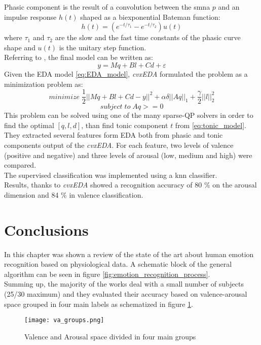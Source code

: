 Phasic component is the result of a convolution between the \gls{smna} $p$ and an impulse response $h(t)$ shaped as a biexponential Bateman function:
\begin{equation}
	h(t)=(e^{-t/\tau_1}-e^{-t/\tau_2})u(t)
\end{equation}
where $\tau_1$ and $\tau_2$ are the slow and the fast time constants of the phasic curve shape and $u(t)$ is the unitary step function.
\\
Referring to \cite{greco2016arousal}, the final model can be written as:
\begin{equation}
	\label{eq:EDA_model}
	y=Mq+Bl+Cd+\varepsilon 
\end{equation}
Given the EDA model \ref{eq:EDA_model}, \textit{cvxEDA} formulated the problem as a minimization problem as:
\begin{equation}
	minimize \; \dfrac{1}{2} ||Mq+Bl+Cd-y||^2+\alpha \delta ||Aq||_1+\dfrac{\gamma}{2}||l||^2_2
\end{equation}
\[subject \; to \; Aq>=0 \]
This problem can be solved using one of the many sparse-QP solvers in order to find the optimal $[q,l,d]$, than find tonic component $t$ from \ref{eq:tonic_model}.
\\
They extracted several features form EDA both from phasic and tonic components output of the \textit{cvxEDA}. For each feature, two levels of valence (positive and negative) and three levels of arousal (low, medium and high) were compared.
\\
The supervised classification was implemented using a \gls{knn} classifier.
\\ \indent
Results, thanks to \textit{cvxEDA} showed a recognition accuracy of 80 \% on the arousal dimension and 84 \% in valence classification.

\section{Conclusions}
In this chapter was shown a review of the state of the art about human emotion recognition based on physiological data. A schematic block of the general algorithm can be seen in figure \ref{fig:emotion_recognition_process}.
\\
Summing up, the majority of the works deal with a small number of subjects (25/30 maximum) and they evaluated their accuracy based on valence-arousal space grouped in four main labels as schematized in figure \ref{fig:va_groups}.
\begin{figure}[h]
    \centering
    \texttt{[image: va\_groups.png]} 
	\caption{Valence and Arousal space divided in four main groups}
    \label{fig:va_groups}
\end{figure}
